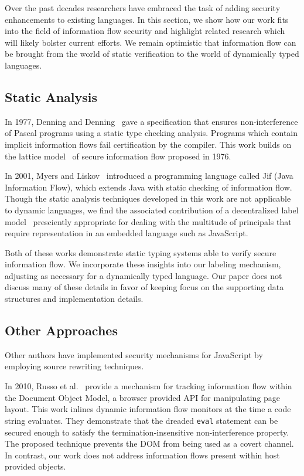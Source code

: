 Over the past decades researchers have embraced the task of adding security enhancements to existing languages.
In this section, we show how our work fits into the field of information flow security and highlight related research which will likely bolster current efforts.
We remain optimistic that information flow can be brought from the world of static verification to the world of dynamically typed languages.

\subsection{Static Analysis}

In 1977, Denning and Denning~\cite{359712} gave a specification that ensures non-interference of Pascal programs using a static type checking analysis.
Programs which contain implicit information flows fail certification by the compiler.
This work builds on the lattice model~\cite{denning1976lattice} of secure information flow proposed in 1976.

In 2001, Myers and Liskov~\cite{myers2001jif} introduced a programming language called Jif (Java Information Flow), which extends Java with static checking of information flow.
Though the static analysis techniques developed in this work are not applicable to dynamic languages, we find the associated contribution of a decentralized label model~\cite{363526} presciently appropriate for dealing with the multitude of principals that require representation in an embedded language such as JavaScript.

Both of these works demonstrate static typing systems able to verify secure information flow.
We incorporate these insights into our labeling mechanism, adjusting as necessary for a dynamically typed language.
Our paper does not discuss many of these details in favor of keeping focus on the supporting data structures and implementation details.

\subsection{Other Approaches}

Other authors have implemented security mechanisms for JavaScript by employing source rewriting techniques.

In 2010, Russo et al.~\cite{1813092} provide a mechanism for tracking information flow within the Document Object Model, a browser provided API for manipulating page layout.
This work inlines dynamic information flow monitors at the time a code string evaluates.
They demonstrate that the dreaded \texttt{eval} statement can be secured enough to satisfy the termination-insensitive non-interference property.
The proposed technique prevents the DOM from being used as a covert channel.
In contrast, our work does not address information flows present within host provided objects.

